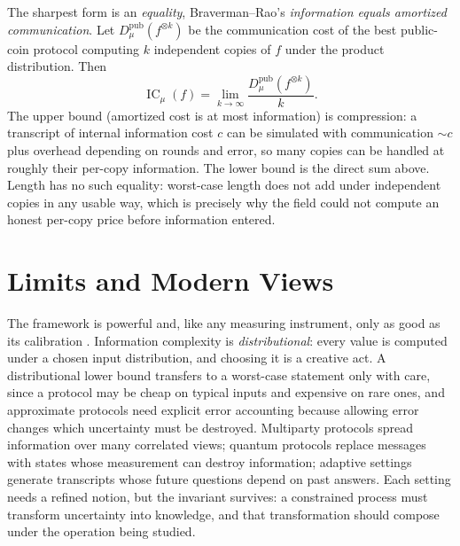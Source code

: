 The sharpest form is an \emph{equality}, Braverman--Rao's \emph{information equals amortized communication}. Let $D^{\mathrm{pub}}_\mu(f^{\otimes k})$ be the communication cost of the best public-coin protocol computing $k$ independent copies of $f$ under the product distribution. Then
\[
\operatorname{IC}_\mu(f)=\lim_{k\to\infty}\frac{D^{\mathrm{pub}}_\mu(f^{\otimes k})}{k}.
\]
The upper bound (amortized cost is at most information) is compression: a transcript of internal information cost $c$ can be simulated with communication $\sim c$ plus overhead depending on rounds and error, so many copies can be handled at roughly their per-copy information. The lower bound is the direct sum above. Length has no such equality: worst-case length does not add under independent copies in any usable way, which is precisely why the field could not compute an honest per-copy price before information entered.

\section{Limits and Modern Views}
The framework is powerful and, like any measuring instrument, only as good as its calibration \cite{imu2022}. Information complexity is \emph{distributional}: every value is computed under a chosen input distribution, and choosing it is a creative act. A distributional lower bound transfers to a worst-case statement only with care, since a protocol may be cheap on typical inputs and expensive on rare ones, and approximate protocols need explicit error accounting because allowing error changes which uncertainty must be destroyed. Multiparty protocols spread information over many correlated views; quantum protocols replace messages with states whose measurement can destroy information; adaptive settings generate transcripts whose future questions depend on past answers. Each setting needs a refined notion, but the invariant survives: a constrained process must transform uncertainty into knowledge, and that transformation should compose under the operation being studied.

